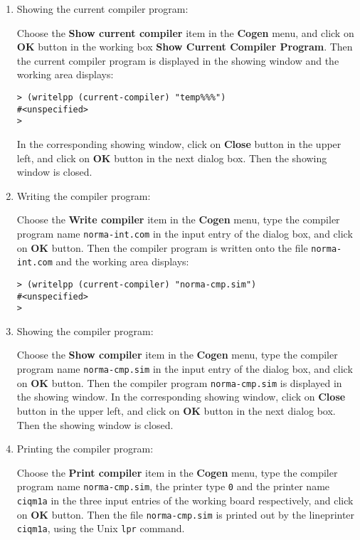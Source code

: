 \begin{sloppypar}
\begin{enumerate}
\item Showing the current compiler program:

    Choose the {\bf Show current compiler} item in the {\bf Cogen}
menu, and click on {\bf OK} button in the working box {\bf Show
Current Compiler Program}.  Then the current compiler program is
displayed in the showing window and the working area displays:

\begin{verbatim}
> (writelpp (current-compiler) "temp%%%")
#<unspecified>
>
\end{verbatim}

    In the corresponding showing window, click on {\bf Close} button
in the upper left, and click on {\bf OK} button in the next dialog
box. Then the showing window is closed.

\item Writing the compiler program:

    Choose the {\bf Write compiler} item in the {\bf Cogen} menu, type
the compiler program name {\tt norma-int.com} in the input entry of
the dialog box, and click on {\bf OK} button.  Then the compiler
program is written onto the file {\tt norma-int.com} and the working
area displays:

\begin{verbatim}
> (writelpp (current-compiler) "norma-cmp.sim")
#<unspecified>
>
\end{verbatim}

\item Showing the compiler program:

    Choose the {\bf Show compiler} item in the {\bf Cogen} menu, type
the compiler program name {\tt norma-cmp.sim} in the input entry of
the dialog box, and click on {\bf OK} button. Then the compiler
program {\tt norma-cmp.sim} is displayed in the showing window. In the
corresponding showing window, click on {\bf Close} button in the upper
left, and click on {\bf OK} button in the next dialog box. Then the
showing window is closed.


\item Printing the compiler program:

     Choose the {\bf Print compiler} item in the {\bf Cogen} menu,
type the compiler program name {\tt norma-cmp.sim}, the printer type
{\tt 0} and the printer name {\tt ciqm1a} in the three input entries
of the working board respectively, and click on {\bf OK} button. Then
the file {\tt norma-cmp.sim} is printed out by the lineprinter {\tt
ciqm1a}, using the Unix {\tt lpr} command.



\end{enumerate}
\end{sloppypar}

